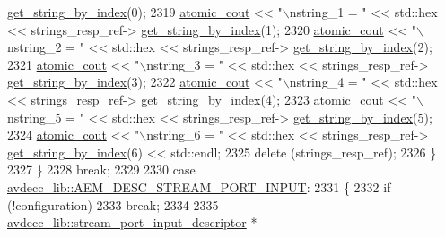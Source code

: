 \begin{DoxyCode}
      \hyperlink{classavdecc__lib_1_1strings__descriptor__response_ae8f3e50f4e5051488a864fd8acc6da31}{get\_string\_by\_index}(0);
2319             \hyperlink{cmd__line_8h_a0bc38ccc65c79ba06c6fcd7b4bf554c3}{atomic\_cout} << \textcolor{stringliteral}{"\(\backslash\)nstring\_1 = "} << std::hex << strings\_resp\_ref->
      \hyperlink{classavdecc__lib_1_1strings__descriptor__response_ae8f3e50f4e5051488a864fd8acc6da31}{get\_string\_by\_index}(1);
2320             \hyperlink{cmd__line_8h_a0bc38ccc65c79ba06c6fcd7b4bf554c3}{atomic\_cout} << \textcolor{stringliteral}{"\(\backslash\)nstring\_2 = "} << std::hex << strings\_resp\_ref->
      \hyperlink{classavdecc__lib_1_1strings__descriptor__response_ae8f3e50f4e5051488a864fd8acc6da31}{get\_string\_by\_index}(2);
2321             \hyperlink{cmd__line_8h_a0bc38ccc65c79ba06c6fcd7b4bf554c3}{atomic\_cout} << \textcolor{stringliteral}{"\(\backslash\)nstring\_3 = "} << std::hex << strings\_resp\_ref->
      \hyperlink{classavdecc__lib_1_1strings__descriptor__response_ae8f3e50f4e5051488a864fd8acc6da31}{get\_string\_by\_index}(3);
2322             \hyperlink{cmd__line_8h_a0bc38ccc65c79ba06c6fcd7b4bf554c3}{atomic\_cout} << \textcolor{stringliteral}{"\(\backslash\)nstring\_4 = "} << std::hex << strings\_resp\_ref->
      \hyperlink{classavdecc__lib_1_1strings__descriptor__response_ae8f3e50f4e5051488a864fd8acc6da31}{get\_string\_by\_index}(4);
2323             \hyperlink{cmd__line_8h_a0bc38ccc65c79ba06c6fcd7b4bf554c3}{atomic\_cout} << \textcolor{stringliteral}{"\(\backslash\)nstring\_5 = "} << std::hex << strings\_resp\_ref->
      \hyperlink{classavdecc__lib_1_1strings__descriptor__response_ae8f3e50f4e5051488a864fd8acc6da31}{get\_string\_by\_index}(5);
2324             \hyperlink{cmd__line_8h_a0bc38ccc65c79ba06c6fcd7b4bf554c3}{atomic\_cout} << \textcolor{stringliteral}{"\(\backslash\)nstring\_6 = "} << std::hex << strings\_resp\_ref->
      \hyperlink{classavdecc__lib_1_1strings__descriptor__response_ae8f3e50f4e5051488a864fd8acc6da31}{get\_string\_by\_index}(6) << std::endl;
2325             \textcolor{keyword}{delete} (strings\_resp\_ref);
2326         \}
2327     \}
2328     \textcolor{keywordflow}{break};
2329 
2330     \textcolor{keywordflow}{case} \hyperlink{namespaceavdecc__lib_ac7b7d227e46bc72b63ee9e9aae15902fa54a680de439da84c5d5037a246d55b3f}{avdecc\_lib::AEM\_DESC\_STREAM\_PORT\_INPUT}:
2331     \{
2332         \textcolor{keywordflow}{if} (!configuration)
2333             \textcolor{keywordflow}{break};
2334 
2335         \hyperlink{classavdecc__lib_1_1stream__port__input__descriptor}{avdecc\_lib::stream\_port\_input\_descriptor} * 

\end{DoxyCode}
